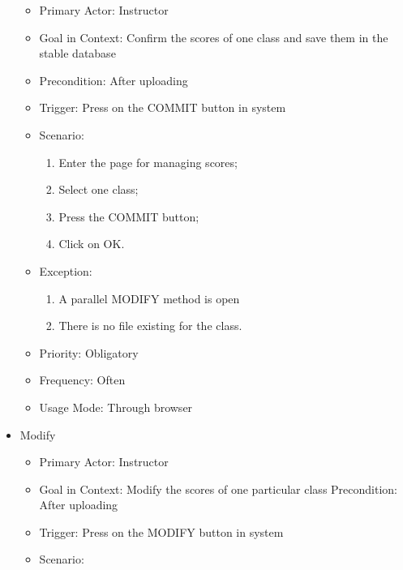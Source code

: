 \documentclass[a4]{article}
\begin{document}
\begin{itemize}
\begin{itemize}
\item Primary Actor: Instructor
\item Goal in Context: Confirm the scores of one class and save them in the stable database
\item Precondition: After uploading
\item Trigger: Press on the COMMIT button in system
\item Scenario: 
\begin{enumerate}
\item Enter the page for managing scores;
\item Select one class;
\item Press the COMMIT button;
\item Click on OK.
\end{enumerate}
\item Exception:
\begin{enumerate}
\item A parallel MODIFY method is open
\item There is no file existing for the class.
\end{enumerate}
\item Priority: Obligatory
\item Frequency: Often
\item Usage Mode: Through browser
\end{itemize}

\item Modify
\begin{itemize}
\item Primary Actor: Instructor
\item Goal in Context: Modify the scores of one particular class
Precondition: After uploading
\item Trigger: Press on the MODIFY button in system
\item Scenario:


\end{itemize}
\end{itemize}
\end{document}

